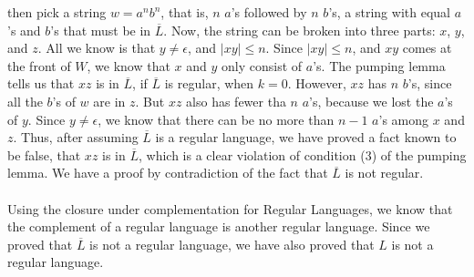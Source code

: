 \documentclass[]{article}
\begin{document}
\begin{enumerate}
    then pick a string $w = a^nb^n$, that is, $n$ $a$'s followed by $n$ $b$'s, a
    string with equal $a$'s and $b$'s that must be in $\overline{L}$. Now, the
    string can be broken into three parts: $x$, $y$, and $z$. All we know is
    that $y \neq \epsilon$, and $|xy| \leq n$. Since $|xy| \leq n$, and $xy$
    comes at the front of $W$, we know that $x$ and $y$ only consist of $a$'s. 
    The pumping lemma tells us that $xz$ is in $\overline{L}$, if $\overline{L}$ 
    is regular, when $k = 0$. However, $xz$ has $n$ $b$'s, since all the $b$'s 
    of $w$ are in $z$. But $xz$ also has fewer tha $n$ $a$'s, because we lost 
    the $a$'s of $y$. Since $y \neq \epsilon$, we know that there can be no more 
    than $n - 1$ $a$'s among $x$ and $z$. Thus, after assuming $\overline{L}$ is 
    a regular language, we have proved a fact known to be false, that $xz$ is in 
    $\overline{L}$, which is a clear violation of condition (3) of the pumping 
    lemma. We have a proof by contradiction of the fact that
    $\overline{L}$ is not regular.\\\\
    Using the closure under complementation for Regular Languages, we know that 
    the complement of a regular language is another regular language. Since we 
    proved that $\overline{L}$ is not a regular language, we have also proved 
    that $L$ is not a regular language.
      
  \end{enumerate}
\end{document}
